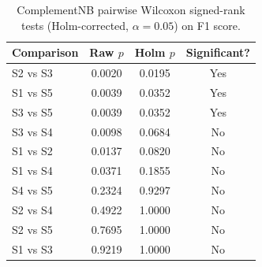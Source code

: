\documentclass[a4paper,10pt]{article}
\begin{document}
\begin{table}[h]
\centering
\label{tab:nb_pairwise}
\begin{tabular}{|l|c|c|c|}
\hline
\textbf{Comparison} & \textbf{Raw $p$} & \textbf{Holm $p$} & \textbf{Significant?} \\
\hline
S2 vs S3  & 0.0020 & 0.0195 & Yes \\
S1 vs S5  & 0.0039 & 0.0352 & Yes \\
S3 vs S5  & 0.0039 & 0.0352 & Yes \\
S3 vs S4  & 0.0098 & 0.0684 & No  \\
S1 vs S2  & 0.0137 & 0.0820 & No  \\
S1 vs S4  & 0.0371 & 0.1855 & No  \\
S4 vs S5  & 0.2324 & 0.9297 & No  \\
S2 vs S4  & 0.4922 & 1.0000 & No  \\
S2 vs S5  & 0.7695 & 1.0000 & No  \\
S1 vs S3  & 0.9219 & 1.0000 & No  \\
\hline
\end{tabular}
\caption{ComplementNB pairwise Wilcoxon signed-rank tests (Holm-corrected,
         $\alpha = 0.05$) on F1 score.}
\end{table}
\end{document}
